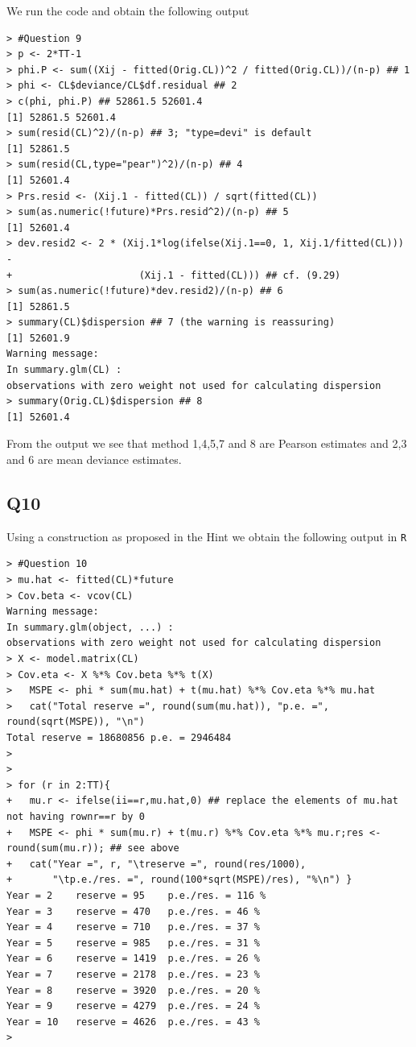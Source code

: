 \documentclass[11pt]{article}
\begin{document}
We run the code and obtain the following output 

\begin{verbatim}
> #Question 9
> p <- 2*TT-1
> phi.P <- sum((Xij - fitted(Orig.CL))^2 / fitted(Orig.CL))/(n-p) ## 1
> phi <- CL$deviance/CL$df.residual ## 2
> c(phi, phi.P) ## 52861.5 52601.4
[1] 52861.5 52601.4
> sum(resid(CL)^2)/(n-p) ## 3; "type=devi" is default
[1] 52861.5
> sum(resid(CL,type="pear")^2)/(n-p) ## 4
[1] 52601.4
> Prs.resid <- (Xij.1 - fitted(CL)) / sqrt(fitted(CL))
> sum(as.numeric(!future)*Prs.resid^2)/(n-p) ## 5
[1] 52601.4
> dev.resid2 <- 2 * (Xij.1*log(ifelse(Xij.1==0, 1, Xij.1/fitted(CL))) -
+                      (Xij.1 - fitted(CL))) ## cf. (9.29)
> sum(as.numeric(!future)*dev.resid2)/(n-p) ## 6
[1] 52861.5
> summary(CL)$dispersion ## 7 (the warning is reassuring)
[1] 52601.9
Warning message:
In summary.glm(CL) :
observations with zero weight not used for calculating dispersion
> summary(Orig.CL)$dispersion ## 8
[1] 52601.4

\end{verbatim}

From the output we see that method 1,4,5,7 and 8 are Pearson estimates and 2,3 and 6 are mean deviance estimates.

\subsection*{Q10}
Using a construction as proposed in the Hint we obtain the following output in \verb|R|

\begin{verbatim}
> #Question 10
> mu.hat <- fitted(CL)*future
> Cov.beta <- vcov(CL)
Warning message:
In summary.glm(object, ...) :
observations with zero weight not used for calculating dispersion
> X <- model.matrix(CL)
> Cov.eta <- X %*% Cov.beta %*% t(X)
>   MSPE <- phi * sum(mu.hat) + t(mu.hat) %*% Cov.eta %*% mu.hat
>   cat("Total reserve =", round(sum(mu.hat)), "p.e. =", round(sqrt(MSPE)), "\n")
Total reserve = 18680856 p.e. = 2946484 
>   
>   
> for (r in 2:TT){
+   mu.r <- ifelse(ii==r,mu.hat,0) ## replace the elements of mu.hat not having rownr==r by 0
+   MSPE <- phi * sum(mu.r) + t(mu.r) %*% Cov.eta %*% mu.r;res <- round(sum(mu.r)); ## see above
+   cat("Year =", r, "\treserve =", round(res/1000),
+       "\tp.e./res. =", round(100*sqrt(MSPE)/res), "%\n") }
Year = 2 	reserve = 95 	p.e./res. = 116 %
Year = 3 	reserve = 470 	p.e./res. = 46 %
Year = 4 	reserve = 710 	p.e./res. = 37 %
Year = 5 	reserve = 985 	p.e./res. = 31 %
Year = 6 	reserve = 1419 	p.e./res. = 26 %
Year = 7 	reserve = 2178 	p.e./res. = 23 %
Year = 8 	reserve = 3920 	p.e./res. = 20 %
Year = 9 	reserve = 4279 	p.e./res. = 24 %
Year = 10 	reserve = 4626 	p.e./res. = 43 %
>
\end{verbatim}
\end{document}
